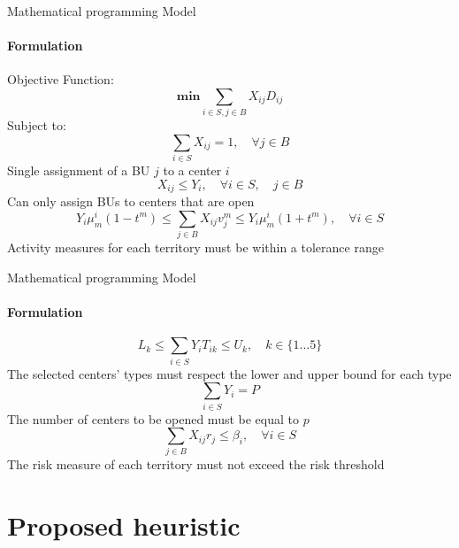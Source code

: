 \documentclass{beamer}
\begin{document}
        


\begin{frame}{Mathematical programming Model}
    \framesubtitle{Formulation}
    Objective Function:
    \begin{equation}
        \mathbf{min}\sum_{i \in S, j \in B}{X_{ij} D_{ij}}
    \end{equation}{}
    Subject to:
    \begin{equation}
       \sum_{i \in S} X_{ij} = 1, \quad \forall j \in B
    \end{equation}{}
    \centering \small Single assignment of a BU $j$ to a center $i$
    \begin{equation}
        X_{ij} \le Y_i, \quad \forall i \in S, \quad j \in B
    \end{equation}{}
    Can only assign BUs to centers that are open
    \begin{equation}
        Y_i\mu_m^i(1-t^m) \le \sum_{j\in B}X_{ij}v_j^m \le Y_i\mu_m^i(1+t^m), \quad \forall i \in S
    \end{equation}{}
    Activity measures for each territory must be within a tolerance range
\end{frame}

\begin{frame}{Mathematical programming Model}
    \framesubtitle{Formulation}
    \begin{equation}
        L_k \le \sum_{i \in S}Y_i T_{ik} \le U_k, \quad k \in \{1 \ldots 5\}
    \end{equation}{}
    The selected centers' types must respect the lower and upper bound for each type
    \begin{equation}
        \sum_{i \in S} Y_i = P
    \end{equation}{}
    The number of centers to be opened must be equal to $p$
    \begin{equation}
        \sum_{j \in B}X_{ij}r_j \le \beta_i, \quad \forall i \in S
    \end{equation}{}
    The risk measure of each territory must not exceed the risk threshold
\end{frame}

\section{Proposed heuristic}
\end{document}
